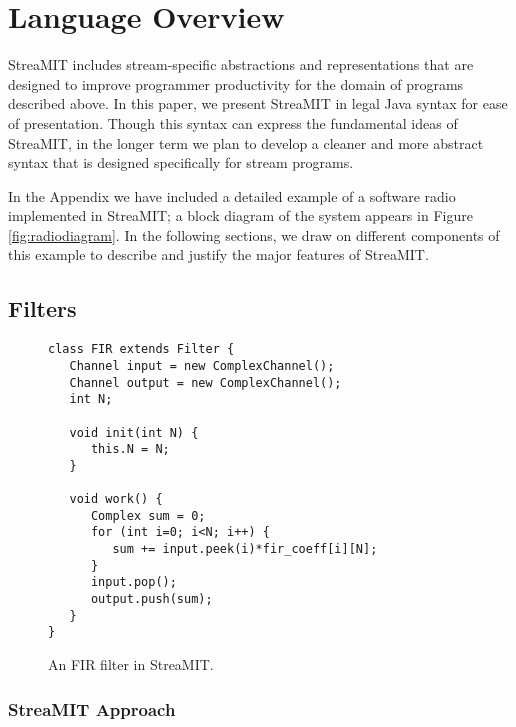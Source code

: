 \section{Language Overview}

\begin{figure*}
\centering
{}
\caption{A block diagram of a software radio.  A detailed
implementation in StreaMIT appears in the Appendix.}
\label{fig:radiodiagram}
\end{figure*}

StreaMIT includes stream-specific abstractions and representations
that are designed to improve programmer productivity for the domain of
programs described above.  In this paper, we present StreaMIT in legal
Java syntax for ease of presentation.  Though this syntax can express
the fundamental ideas of StreaMIT, in the longer term we plan to
develop a cleaner and more abstract syntax that is designed
specifically for stream programs.

In the Appendix we have included a detailed example of a software
radio implemented in StreaMIT; a block diagram of the system appears
in Figure \ref{fig:radiodiagram}.  In the following sections, we draw
on different components of this example to describe and justify the
major features of StreaMIT.

\subsection{Filters}

\begin{figure}
\scriptsize
\begin{verbatim}
class FIR extends Filter {
   Channel input = new ComplexChannel();
   Channel output = new ComplexChannel();           
   int N;

   void init(int N) {
      this.N = N;
   }

   void work() {
      Complex sum = 0;
      for (int i=0; i<N; i++) {
         sum += input.peek(i)*fir_coeff[i][N];
      }
      input.pop();
      output.push(sum);
   }
}
\end{verbatim}
\vspace{-12pt}
\caption{\protect\small An FIR filter in StreaMIT.
\protect\label{fig:firfilter}}
\vspace{-12pt}
\end{figure}

\subsubsection{StreaMIT Approach}

